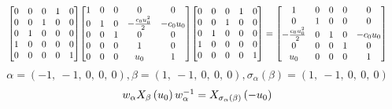 \documentclass[11pt]{article}
\theoremstyle{definition}
\begin{document}
\[
\scaletoalign{\textwidth}{{\left[\begin{matrix}0 & 0 & 0 & 1 & 0\\0 & 0 & 1 & 0 & 0\\0 & 1 & 0 & 0 & 0\\1 & 0 & 0 & 0 & 0\\0 & 0 & 0 & 0 & 1\end{matrix}\right]} {\left[\begin{matrix}1 & 0 & 0 & 0 & 0\\0 & 1 & 0 & - \frac{c_{0} u_{0}^{2}}{2} & - c_{0} u_{0}\\0 & 0 & 1 & 0 & 0\\0 & 0 & 0 & 1 & 0\\0 & 0 & 0 & u_{0} & 1\end{matrix}\right]} {\left[\begin{matrix}0 & 0 & 0 & 1 & 0\\0 & 0 & 1 & 0 & 0\\0 & 1 & 0 & 0 & 0\\1 & 0 & 0 & 0 & 0\\0 & 0 & 0 & 0 & 1\end{matrix}\right]} = {\left[\begin{matrix}1 & 0 & 0 & 0 & 0\\0 & 1 & 0 & 0 & 0\\- \frac{c_{0} u_{0}^{2}}{2} & 0 & 1 & 0 & - c_{0} u_{0}\\0 & 0 & 0 & 1 & 0\\u_{0} & 0 & 0 & 0 & 1\end{matrix}\right]}}
\]
\[
\alpha = \left( -1, \  -1, \  0, \  0, \  0\right), \beta = \left( 1, \  -1, \  0, \  0, \  0\right), \sigma_{\alpha}(\beta) = \left( 1, \  -1, \  0, \  0, \  0\right)
\]
\[
\scaletoalign{\textwidth}{w_{\alpha} X_{\beta}\left(u_{0}\right) w_{\alpha}^{-1} = X_{\sigma_{\alpha}\left(\beta\right)}\left(- u_{0}\right)}
\]
\end{document}
